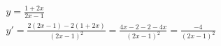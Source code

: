 \begin{ex}
\begin{align}
&y=\frac{1+2x}{2x-1}\nonumber\\
&y'=\frac{2(2x-1)-2(1+2x)}{(2x-1)^2}=\frac{4x-2-2-4x}{(2x-1)^2}=\frac{-4}{(2x-1)^2}\nonumber
\end{align}
\end{ex}
